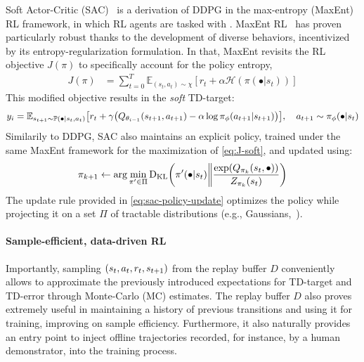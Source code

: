 Soft Actor-Critic (SAC)~\citep{haarnojaSoftActorCriticOffPolicy2018} is a derivation of DDPG in the max-entropy (MaxEnt) RL framework, in which RL agents are tasked with .
MaxEnt RL~\citep{haarnojaReinforcementLearningDeep2017} has proven particularly robust thanks to the development of diverse behaviors, incentivized by its entropy-regularization formulation.
In that, MaxEnt revisits the RL objective \( J (\pi) \) to specifically account for the policy entropy,
\begin{align}
    J(\pi) &= \sum_{t=0}^T \mathbb{E}_{(s_t, a_t) \sim \chi} \left[ r_t + \alpha \mathcal H(\pi (\bullet \vert s_t)) \right] \label{eq:J-soft}
\end{align}
This modified objective results in the \emph{soft} TD-target:
\begin{equation}\label{eq:soft-td-target}
    y_i = \mathbb E_{s_{t+1} \sim \mathbb P( \bullet \vert s_t, a_t)} \left[ r_t + \gamma \left( Q_{\theta_{i-1}} (\stateplusone, a_{t+1}) - \alpha \log \pi_\phi(a_{t+1} \vert \stateplusone) \right) \right], \quad a_{t+1} \sim \pi_\phi(\bullet \vert s_t)
\end{equation}
Similarily to DDPG, SAC also maintains an explicit policy, trained under the same MaxEnt framework for the maximization of \ref{eq:J-soft}, and updated using:
\begin{equation}\label{eq:sac-policy-update}
    \pi_{k+1} \leftarrow \arg\min_{\pi^\prime \in \Pi} \DKL \left(\pi^\prime (\bullet \vert \state) \bigg\Vert \frac{\exp(Q_{\pi_k}(s_t, \bullet))}{Z_{\pi_k}(s_t)} \right)
\end{equation}
The update rule provided in \ref{eq:sac-policy-update} optimizes the policy while projecting it on a set \( \Pi \) of tractable distributions (e.g., Gaussians,~\citet{haarnojaReinforcementLearningDeep2017}).

\paragraph{Sample-efficient, data-driven RL}
Importantly, sampling \( (s_t, a_t, r_t, s_{t+1}) \) from the replay buffer \( D \) conveniently allows to approximate the previously introduced expectations for TD-target and TD-error through Monte-Carlo (MC) estimates.
The replay buffer \( D \) also proves extremely useful in maintaining a history of previous transitions and using it for training, improving on sample efficiency.
Furthermore, it also naturally provides an entry point to inject offline trajectories recorded, for instance, by a human demonstrator, into the training process.

